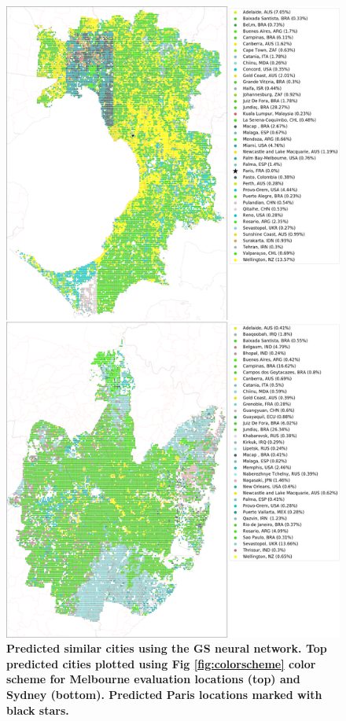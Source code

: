\documentclass[10pt,letterpaper,hidelinks]{article}
\begin{document}
\begin{figure}[!htbp]
\centering    
\includegraphics[scale=0.16]{Images/PlosOne/Fig8.png} 
\caption{\bf Predicted similar cities using the GS neural network. Top predicted cities plotted using Fig \ref{fig:colorscheme} color scheme for Melbourne evaluation locations (top) and Sydney (bottom). Predicted Paris locations marked with black stars.} 
 \label{fig:melsat}  
\end{figure} 
\end{document}
